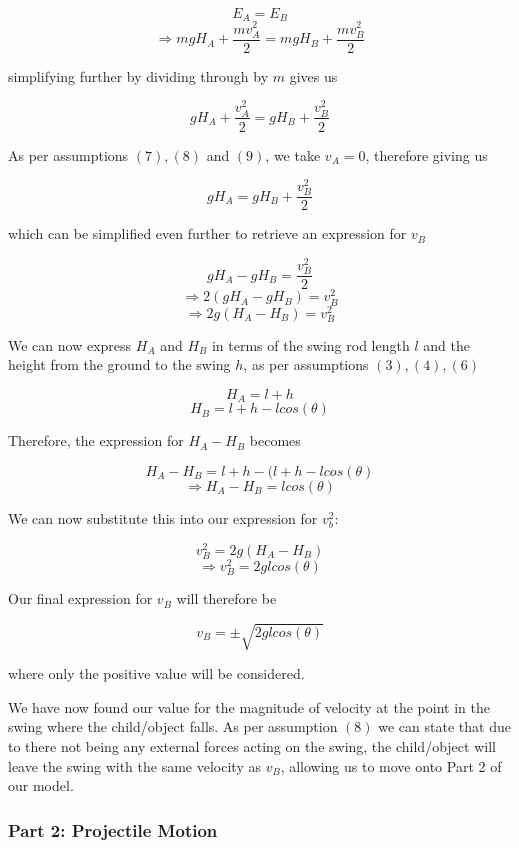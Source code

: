 \documentclass{article}
\begin{document}
\[ E_A = E_B \]
\begin{equation}
    \Rightarrow mgH_A + \frac{mv_A^2}{2} = mgH_B + \frac{mv_B^2}{2}
\end{equation}

simplifying further by dividing through by $m$ gives us 

\[ gH_A + \frac{v_A^2}{2} = gH_B + \frac{v_B^2}{2}\]

As per assumptions $(7), (8)$ and $(9)$, we take $v_A = 0$, therefore giving us

\[ gH_A = gH_B + \frac{v_B^2}{2}\]

which can be simplified even further to retrieve an expression for $v_B$

\[ gH_A - gH_B = \frac{v_B^2}{2}\]
\[\Rightarrow 2(gH_A - gH_B) = v_B^2\]
\begin{equation}
    \Rightarrow 2g(H_A - H_B) = v_B^2
\end{equation}

We can now express $H_A$ and $H_B$ in terms of the swing rod length $l$ and the height from the ground to the swing $h$, as per assumptions $(3), (4), (6)$

\[H_A = l + h \]
\[H_B = l + h - lcos(\theta) \]

Therefore, the expression for $H_A - H_B$ becomes

\[H_A - H_B = l + h - (l + h - lcos(\theta) \]
\begin{equation}
    \Rightarrow H_A - H_B = lcos(\theta)
\end{equation}

We can now substitute this into our expression for $v_b^2$:

\[v_B^2 = 2g(H_A - H_B)\]
\[\Rightarrow v_B^2 = 2glcos(\theta)\]

Our final expression for $v_B$ will therefore be 

\begin{equation}
    v_B = \pm \sqrt{2glcos(\theta)}
\end{equation}

where only the positive value will be considered.
\par
\noindent We have now found our value for the magnitude of velocity at the point in the swing where the child/object falls. As per assumption $(8)$ we can state that due to there not being any external forces acting on the swing, the child/object will leave the swing with the same velocity as $v_B$, allowing us to move onto Part 2 of our model. 

\subsubsection*{Part 2: Projectile Motion}
\end{document}
